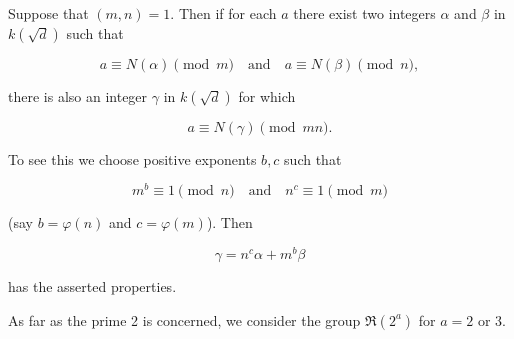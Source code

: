 Suppose that $(m, n) = 1$. Then if for each $a$ there exist two integers $\alpha$ and $\beta$ in $k(\sqrt{d})$ such that

$$a \equiv N(\alpha) \pmod{m} \quad \text{and} \quad a \equiv N(\beta) \pmod{n},$$

there is also an integer $\gamma$ in $k(\sqrt{d})$ for which

$$a \equiv N(\gamma) \pmod{mn}.$$

To see this we choose positive exponents $b, c$ such that

$$m^b \equiv 1 \pmod{n} \quad \text{and} \quad n^c \equiv 1 \pmod{m}$$

(say $b = \varphi(n)$ and $c = \varphi(m)$). Then

$$\gamma = n^c\alpha + m^b\beta$$

has the asserted properties.

As far as the prime 2 is concerned, we consider the group $\Re(2^a)$ for $a = 2$ or 3.
